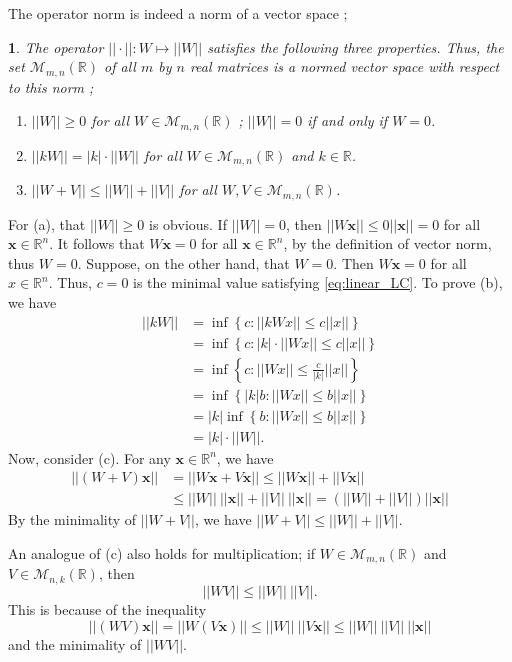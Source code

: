 \documentclass[12pt]{report}
\numberwithin{figure}{chapter}
\theoremstyle{plain}
\theoremstyle{definition}
\theoremstyle{corollary}
\theoremstyle{definition}
\theoremstyle{plain}
\newtheorem{proposition}[theorem]{\protect\propositionname}
\theoremstyle{definition}
\theoremstyle{plain}
\providecommand{\propositionname}{Proposition}
\newcommand\bx{\ensuremath{\boldsymbol x}}
\begin{document}
The operator norm is indeed a norm of a vector space ;
\begin{proposition}\label{prop:operator_norm_1}
The operator \(||\cdot||:W\mapsto||W||\) satisfies the following three properties.
Thus, the set \(\mathcal M_{m,n}(\mathbb R)\) of all \(m\) by \(n\) real matrices is a normed vector space with respect to this norm ;
\begin{enumerate}[label=(\alph*)]
\item
\(||W||\ge0\) for all \(W\in\mathcal M_{m,n}(\mathbb R)\) ; \(||W||=0\) if and only if \(W=0\).
\item
\(||kW||=|k|\cdot||W||\) for all \(W\in\mathcal M_{m,n}(\mathbb R)\) and \(k\in\mathbb R\).
\item
\(||W+V||\le||W||+||V||\) for all \(W,V\in\mathcal M_{m,n}(\mathbb R)\).
\end{enumerate}
\end{proposition}
For (a), that \(||W||\ge0\) is obvious.
If \(||W||=0\), then \(||W\bx||\le 0||\bx||=0\) for all \(\bx\in\mathbb R^n\).
It follows that \(W\bx=0\) for all \(\bx\in\mathbb R^n\), by the definition of vector norm, thus \(W=0\).
Suppose, on the other hand, that \(W=0\). Then \(W\bx=0\) for all \(x\in\mathbb R^n\).
Thus, \(c=0\) is the minimal value satisfying \eqref{eq:linear_LC}.
To prove (b), we have
\begin{align*}
||kW||
&=\inf\left\{c:||kWx||\le c||x||\right\}\\
&=\inf\left\{c:|k|\cdot||Wx||\le c||x||\right\}\\
&=\inf\left\{c:||Wx||\le\frac{c}{|k|}||x||\right\}\\
&=\inf\left\{|k|b:||Wx||\le b||x||\right\}\\
&=|k|\inf\left\{b:||Wx||\le b||x||\right\}\\
&=|k|\cdot||W||.
\end{align*}
Now, consider (c).
For any \(\bx\in\mathbb R^n\), we have
\begin{align*}
||(W+V)\bx||
&=||W\bx+V\bx||\le||W\bx||+||V\bx||\\
&\le||W||\:||\bx||+||V||\:||\bx||=(||W||+||V||)||\bx||
\end{align*}
By the minimality of \(||W+V||\), we have \(||W+V||\le||W||+||V||\).

An analogue of (c) also holds for multiplication;
if \(W\in\mathcal M_{m,n}(\mathbb R)\) and \(V\in\mathcal M_{n,k}(\mathbb R)\), then
\begin{equation}\label{eq:multiplicative_inequality}
||WV||\le||W||\:||V||.
\end{equation}
This is because of the inequality
\[||(WV)\bx||=||W(V\bx)||\le||W||\:||V\bx||\le||W||\:||V||\:||\bx||\]
and the minimality of \(||WV||\).
\end{document}
